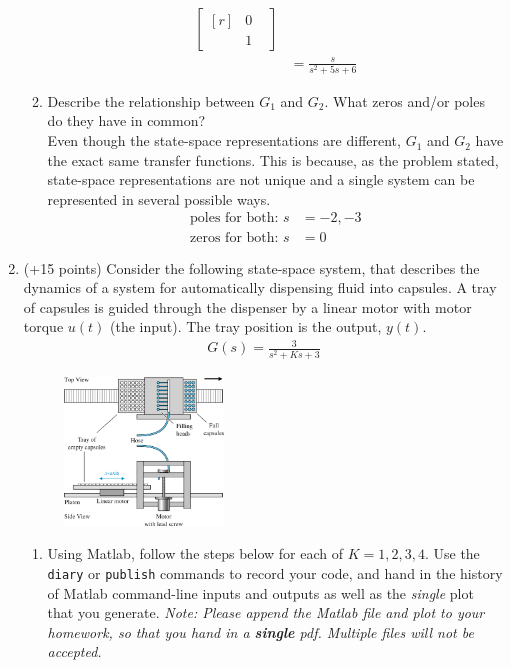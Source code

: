 \documentclass[11pt]{article}
\begin{document}
\begin{enumerate}
\begin{enumerate}
\begin{align*}
            \begin{bmatrix*}[r]
                &0&\\
                &1&
            \end{bmatrix*}\\
            &=\frac{s}{s^2+5s+6}
        \end{align*}
        \item Describe the relationship between \(G_1\) and \(G_2\). What zeros and/or poles do they have in common?\\[1em]
        Even though the state-space representations are different, \(G_1\) and \(G_2\) have the exact same transfer functions. This is because, as the problem stated, state-space representations are not unique and a single system can be represented in several possible ways.
        \begin{align*}
            \text{poles for both: }s&=-2,-3\\
            \text{zeros for both: }s&=0
        \end{align*}
    \end{enumerate}
    \item (+15  points) Consider the following state-space system, that describes the dynamics of a system for automatically dispensing fluid into capsules. A tray of capsules is guided through the dispenser by a linear motor with motor torque \(u(t)\) (the input). The tray position is the output, \(y(t)\).
    \begin{align}
        G(s)=\frac{3}{s^2+Ks+3}
    \end{align}
    \begin{figure}[h!]
        \centering
        \includegraphics[width=0.4\textwidth]{PS2-Q3.png}
    \end{figure}
    \begin{enumerate}
        \item Using Matlab, follow the steps below for each of \(K= 1,2,3,4\). Use the \texttt{diary} or \texttt{publish} commands to record your code, and hand in the history of Matlab command-line inputs and outputs as well as the \textit{single} plot that you generate. \textit{Note: Please append the Matlab file and plot to your homework, so that you hand in a \textbf{single} pdf. Multiple files will not be accepted.}

\end{enumerate}
\end{enumerate}
\end{document}
